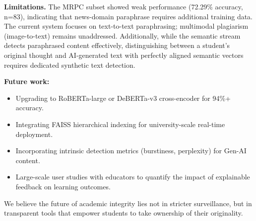 \documentclass[pdflatex,sn-basic]{sn-jnl}
\begin{document}
\textbf{Limitations.} The MRPC subset showed weak performance (72.29\% accuracy, n=83), indicating that news-domain paraphrase requires additional training data. The current system focuses on text-to-text paraphrasing; multimodal plagiarism (image-to-text) remains unaddressed. Additionally, while the semantic stream detects paraphrased content effectively, distinguishing between a student's original thought and AI-generated text with perfectly aligned semantic vectors requires dedicated synthetic text detection.

\textbf{Future work:}
\begin{itemize}
    \item Upgrading to RoBERTa-large or DeBERTa-v3 cross-encoder for 94\%+ accuracy.
    \item Integrating FAISS hierarchical indexing for university-scale real-time deployment.
    \item Incorporating intrinsic detection metrics (burstiness, perplexity) for Gen-AI content.
    \item Large-scale user studies with educators to quantify the impact of explainable feedback on learning outcomes.
\end{itemize}

We believe the future of academic integrity lies not in stricter surveillance, but in transparent tools that empower students to take ownership of their originality.
\end{document}

